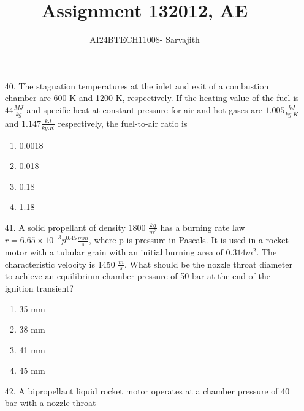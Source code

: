 \documentclass[journal]{IEEEtran}
\begin{document}

\vspace{3cm}


\author{AI24BTECH11008- Sarvajith
}
\title{Assignment 13}
{\let\newpage\relax\maketitle}
\title{2012, AE}
\renewcommand{\thefigure}{\theenumi}
\renewcommand{\thetable}{\theenumi}
\setlength{\intextsep}{10pt} %
\renewcommand{\thetable}{\theenumi}
\begin{enumerate}
    \item[40.] The stagnation temperatures at the inlet and exit of a combustion chamber are 600 K and 1200 K,
    respectively. If the heating value of the fuel is $44 \frac{MJ}{kg}$ and specific heat at constant pressure for
    air and hot gases are $1.005\frac{kJ}{kg.K}$ and $1.147\frac{kJ}{kg.K}$ respectively, the fuel-to-air ratio is 
    \begin{enumerate}[label=(\Alph*)]
        \item 0.0018
        \item 0.018
        \item 0.18
        \item 1.18
    \end{enumerate}
    \item[41.] A solid propellant of density 1800 $\frac{kg}{m^3}$ has a burning rate law $r = 6.65 \times 10^{-3}p^{0.45} \frac{mm}{s}$, where p is pressure in Pascals. It is used in a rocket motor with a tubular grain with an initial burning area of $0.314 m^2$. The characteristic velocity is 1450 $\frac{m}{s}$. What should be the nozzle throat diameter to achieve an equilibrium chamber pressure of 50 bar at the end of the ignition transient?
    \begin{enumerate}[label=(\Alph*)]
        \item 35 mm
        \item 38 mm
        \item 41 mm
        \item 45 mm
    \end{enumerate}
    \item[42.] A bipropellant liquid rocket motor operates at a chamber pressure of 40 bar with a nozzle throat

\end{enumerate}
\end{document}
